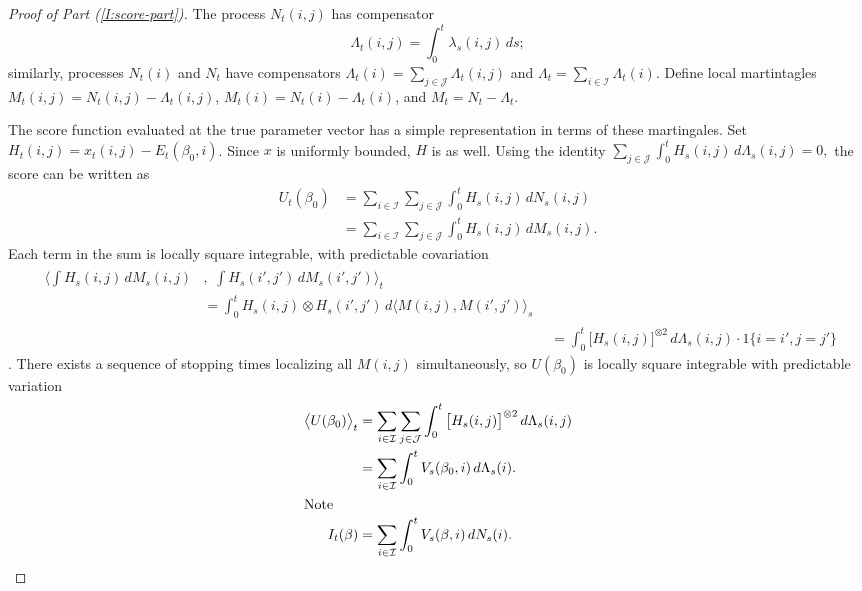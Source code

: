 \documentclass[aoas,preprint]{imsart}
\begin{document}
\begin{proof}[Proof of Part \textit{(\ref{I:score-part})}]
The process $N_t(i,j)$ has compensator
\begin{equation}
    \Lambda_t(i,j)
        =
            \int_0^t \lambda_s(i,j) \, ds;
\end{equation}
similarly, processes $N_t(i)$ and $N_t$ have compensators
$\Lambda_t(i) = \sum_{j \in \mathcal{J}} \Lambda_t(i,j)$
and $\Lambda_t = \sum_{i \in \mathcal{I}} \Lambda_t(i)$.  Define local
martintagles $M_t(i,j) = N_t(i,j) - \Lambda_t(i,j)$,
$M_t(i) = N_t(i) - \Lambda_t(i)$, and 
$M_t = N_t - \Lambda_t$.  

The score function evaluated at the true parameter vector has a simple
representation in terms of these martingales.  Set
$H_t(i,j) = x_t(i,j) - E_t(\beta_0,i)$.  Since $x$ is uniformly
bounded, $H$ is as well.  Using the identity
\(
    \sum_{j \in \mathcal{J}}
    \int_0^t
        H_s(i,j) \,
        d\Lambda_s(i,j)
    =
    0,
\)
the score can be written as
\begin{align*}
    U_t(\beta_0)
        &=
        \sum_{i \in \mathcal{I}}
        \sum_{j \in \mathcal{J}}
        \int_0^t
            H_s(i,j) \, dN_s(i,j) \\
        &=
        \sum_{i \in \mathcal{I}}
        \sum_{j \in \mathcal{J}}
        \int_0^t
            H_s(i,j) \, dM_s(i,j).
\end{align*}
Each term in the sum is locally square integrable, with predictable
covariation
\begin{align*}
    \begin{split}
        \bigg\langle
            \int
                H_s(i,j) \, dM_s(i,j)
        &, \, \,
            \int
                H_s(i',j') \, dM_s(i',j')
        \bigg\rangle_t \\
        &=
            \int_0^t
                H_s(i,j) \otimes H_s(i',j') \,
                d\big\langle M(i,j), M(i',j')\big\rangle_s
    \end{split} \\
        &=
            \int_0^t
                \big[ H_s(i,j) \big]^{\otimes 2} \,
                d\Lambda_s(i,j)
            \cdot
            1\{ i = i', j = j' \}
\end{align*}
\cite[Thm.~2.4.3]{fleming1991counting}.  There exists a sequence
of stopping times localizing all $M(i,j)$ simultaneously, so $U(\beta_0)$ is
locally square integrable with predictable variation
\begin{align*}
    \big\langle U(\beta_0) \big\rangle_t
        &=
            \sum_{i \in \mathcal{I}}
            \sum_{j \in \mathcal{J}}
            \int_0^t
                \big[ H_s(i,j) \big]^{\otimes 2} \,
                d\Lambda_s(i,j) \\
        &=
            \sum_{i \in \mathcal{I}}
            \int_0^t
                V_s(\beta_0, i) \,
                d\Lambda_s(i). \\
\intertext{Note}
    I_t(\beta)
        &=
            \sum_{i \in \mathcal{I}}
            \int_0^t
                V_s(\beta, i) \,
                dN_s(i).
\end{align*}


\end{proof}
\end{document}
